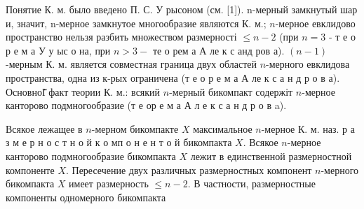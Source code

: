 \documentclass[10pt]{article}
\begin{document}
Понятие К. м. было введено П. С. У рысоном (см. [1]). n-мерный замкнутый шар и, значит, n-мерное замкнутое многообразие являются К. м.; $n$-мерное евклидово пространство нельзя разбить множеством размерності $\leqslant n-2$ (при $n=3$ - т е о р е м а У у ыс о на, при $n>3-$ те о рем а А ле к с анд ров а). $(n-1)$-мерным К. м. является совместная граница двух областей $n$-мерного евклидова пространства, одна из к-рых ограничена (т е о р е м а А ле к с а н д р о в а). ОсновноІ̆̈ факт теории К. м.: всякий $n$-мерный бикомпакт содержіт $n$-мерное канторово подмногообразие (т е ор е м а А л е к с а н д р о в a).



Всякое лежащее в $n$-мерном бикомпакте $X$ максимальное $n$-мерное К. м. наз. р а з м е р н о с т н о й к о мп о н е н т о й бикомпакта $X$. Всякое $n$-мерное канторово подмногообразие бикомпакта $X$ лежит в единственной размерностной компоненте $X$. Пересечение двух различных размерностных компонент $n$-мерного бикомпакта $X$ имеет размерность $\leqslant n-2$. В частности, размерностные компоненты одномерного бикомпакта
\end{document}
